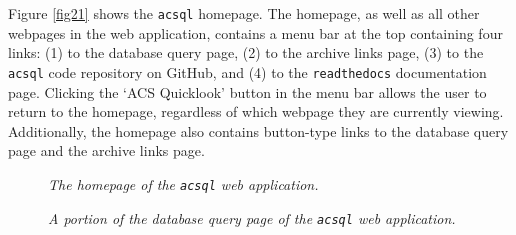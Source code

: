 \documentclass[10pt,journal,compsoc]{IEEEtran}
\begin{document}
Figure \ref{fig21} shows the \texttt{acsql} homepage.  The homepage, as well as all other webpages in the web application, contains a menu bar at the top containing four links:
(1) to the database query page, (2) to the archive links page, (3) to the \texttt{acsql} code repository on GitHub, and (4) to the \texttt{readthedocs} documentation page.  Clicking the
`ACS Quicklook' button in the menu bar allows the user to return to the homepage, regardless of which webpage they are currently viewing.  Additionally, the homepage also contains button-type
links to the database query page and the archive links page.

\begin{figure}[!t]
\centering
{}
\caption{\textit{The homepage of the \texttt{acsql} web application.}}
\label{fig21}
\caption{\textit{A portion of the database query page of the \texttt{acsql} web application.}}
\label{fig22}
\end{figure}
\end{document}
